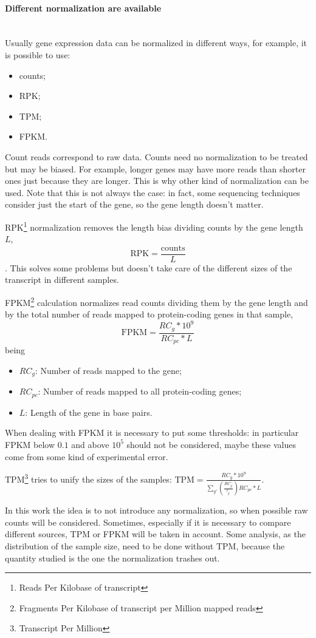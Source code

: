 \paragraph{Different normalization are available}\mbox{}\\
Usually gene expression data can be normalized in different ways, for example, it is possible to use:
\begin{itemize}
	\item counts;
	\item RPK;
	\item TPM;
	\item FPKM.
\end{itemize}
Count reads correspond to raw data. Counts need no normalization to be treated but may be biased. For example, longer genes may have more reads than shorter ones just because they are longer. This is why other kind of normalization can be used. Note that this is not always the case: in fact, some sequencing techniques consider just the start of the gene, so the gene length doesn't matter.   

RPK\footnote{Reads Per Kilobase of transcript} normalization removes the length bias dividing counts by the gene length $L$, \[\text{RPK}=\frac{\text{counts}}{L}\]. 
This solves some problems but doesn't take care of the different sizes of the transcript in different samples.

FPKM\footnote{Fragments Per Kilobase of transcript per Million mapped reads} calculation normalizes read counts dividing them by the gene length and by the total number of reads mapped to protein-coding genes in that sample,
\[
\text{FPKM} = \frac{RC_g*10^9}{RC_{pc}*L}
\]
being
\begin{itemize}
	\item $RC_g$: Number of reads mapped to the gene;
	\item $RC_{pc}$: Number of reads mapped to all protein-coding genes;
	\item $L$: Length of the gene in base pairs.
\end{itemize}
When dealing with FPKM it is necessary to put some thresholds: in particular FPKM below $0.1$ and above $10^5$ should not be considered, maybe these values come from some kind of experimental error.

TPM\footnote{Transcript Per Million} tries to unify the sizes of the samples: $\text{TPM} = \frac{RC_g*10^9}{\sum_{g\prime} \left(\frac{RC_{g^\prime}}{l_{g^\prime}}\right) RC_{pc}*L}$.

In this work the idea is to not introduce any normalization, so when possible raw counts will be considered. Sometimes, especially if it is necessary to compare different sources, TPM or FPKM will be taken in account. Some analysis, as the distribution of the sample size, need to be done without TPM, because the quantity studied is the one the normalization trashes out.

